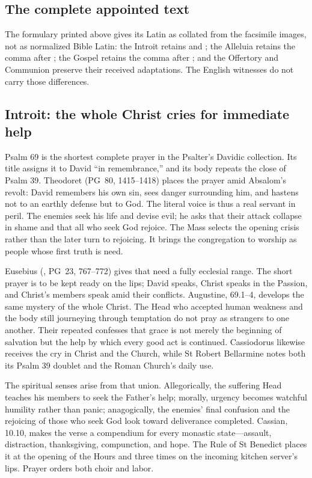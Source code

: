 \subsection*{The complete appointed text}

The formulary printed above gives its Latin as collated from the facsimile
images, not as normalized Bible Latin: the Introit retains
 and ; the Alleluia retains the comma after
; the Gospel retains the comma after ; and
the Offertory and Communion preserve their received adaptations. The English
witnesses do not carry those differences.

\elementguard
\subsection*{Introit: the whole Christ cries for immediate help }

Psalm 69 is the shortest complete prayer in the Psalter's Davidic collection.
Its title assigns it to David ``in remembrance,'' and its body repeats the
close of Psalm 39. Theodoret (PG~80, 1415--1418) places the prayer amid
Absalom's revolt: David remembers his own sin, sees danger surrounding him,
and hastens not to an earthly defense but to God. The literal voice is thus a
real servant in peril. The enemies seek his life and devise evil; he asks that
their attack collapse in shame and that all who seek God rejoice. The Mass
selects the opening crisis rather than the later turn to rejoicing. It brings
the congregation to worship as people whose first truth is need.

Eusebius (, PG~23, 767--772) gives that need a
fully ecclesial range. The short prayer is to be kept ready on the lips; David
speaks, Christ speaks in the Passion, and Christ's members speak amid their
conflicts. Augustine,  69.1--4, develops the same
mystery of the whole Christ. The Head who accepted human weakness and the body
still journeying through temptation do not pray as strangers to one another.
Their repeated  confesses that grace is
not merely the beginning of salvation but the help by which every good act is
continued. Cassiodorus likewise receives the cry in Christ and the Church,
while St Robert Bellarmine notes both its Psalm 39 doublet and the Roman
Church's daily use.

The spiritual senses arise from that union. Allegorically, the suffering Head
teaches his members to seek the Father's help; morally, urgency becomes
watchful humility rather than panic; anagogically, the enemies' final confusion
and the rejoicing of those who seek God look toward deliverance completed.
Cassian,  10.10, makes the verse a compendium for every
monastic state---assault, distraction, thanksgiving, compunction, and hope.
The Rule of St Benedict places it at the opening of the Hours and three times
on the incoming kitchen server's lips. Prayer orders both choir and labor.


